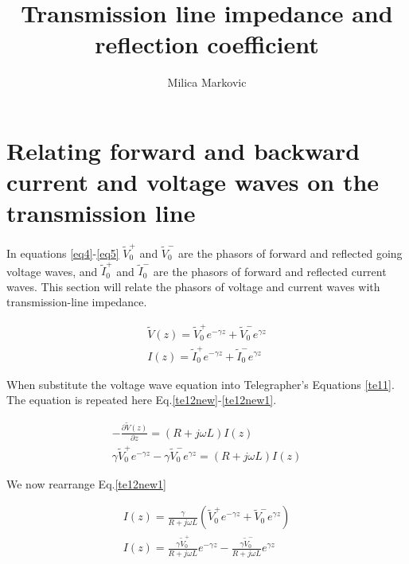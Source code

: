 \documentclass{ximera}
\title{Transmission line impedance and reflection coefficient}
\author{Milica Markovic}
\begin{document}
  
\begin{abstract}  

\end{abstract}  
\maketitle    











\section{Relating forward and backward current and voltage waves on
the transmission line}


In equations \ref{eq4}-\ref{eq5} $\tilde{V}_0^+$ and $\tilde{V}_0^-$ are the phasors of forward and
reflected going voltage waves, and $\tilde{I}_0^+$ and $\tilde{I}_0^-$ are the phasors of forward and
reflected current waves. This section will relate the phasors of voltage and
current waves with transmission-line impedance.


\begin{eqnarray}
\tilde{V}(z)=\tilde{V}_0^+ e^{-\gamma z} + \tilde{V}_0^- e^{\gamma z}\label{eq4} \\
I(z)=\tilde{I}_0^+ e^{-\gamma z} + \tilde{I}_0^- e^{\gamma z}\label{eq5}
\end{eqnarray}




When substitute the voltage wave equation into Telegrapher's  Equations
\ref{te11}. The equation is repeated here  Eq.\ref{te12new}-\ref{te12new1}.




\begin{eqnarray}
-\frac{\partial \tilde{V}(z)}{\partial z} = (R+j\omega L) I(z) \label{te12new} \\
\gamma \tilde{V}_0^+ e^{-\gamma z} - \gamma \tilde{V}_0^- e^{\gamma z} = (R+ j \omega
L) I(z) \label{te12new1}
\end{eqnarray}

We now rearrange Eq.\ref{te12new1}

\begin{eqnarray}
I(z)=\frac{\gamma}{R+j\omega L} ( \tilde{V}_0^+ e^{-\gamma z} + \tilde{V}_0^-
 e^{\gamma z})  \nonumber  \\
I(z)=\frac{\gamma \tilde{V}_0^+}{R+ j \omega L} e^{-\gamma z} - \frac{\gamma \tilde{V}_0^-}{R+ j \omega L} e^{\gamma z} \label{eq3}
\end{eqnarray}
\end{document}
